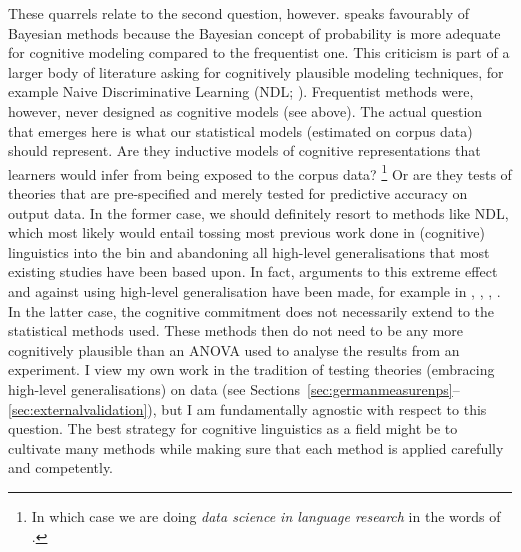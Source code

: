 \documentclass[USenglish]{article}
\begin{document}
These quarrels relate to the second question, however.
\citet[301--302]{Divjak2016a} speaks favourably of Bayesian methods because the Bayesian concept of probability is more adequate for cognitive modeling compared to the frequentist one.
This criticism is part of a larger body of literature asking for cognitively plausible modeling techniques, for example Naive Discriminative Learning (NDL; \citealp{Baayen2011,BaayenEa2013,MilinEa2016,TheijssenEa2013}).
Frequentist methods were, however, never designed as cognitive models (see above).
The actual question that emerges here is what our statistical models (estimated on corpus data) should represent.
Are they inductive models of cognitive representations that learners would infer from being exposed to the corpus data?%
\footnote{In which case we are doing \textit{data science in language research} in the words of \citealp{MilinEa2016}.}
Or are they tests of theories that are pre-specified and merely tested for predictive accuracy on output data.
In the former case, we should definitely resort to methods like NDL, which most likely would entail tossing most previous work done in (cognitive) linguistics into the bin and abandoning all high-level generalisations that most existing studies have been based upon.
In fact, arguments to this extreme effect and against using high-level generalisation have been made, for example in \cite{BaayenEa2016}, \citet[299--300]{Divjak2016a}, \cite{RamscarPort2016}, \cite{TheijssenEa2013}.
In the latter case, the cognitive commitment does not necessarily extend to the statistical methods used.
These methods then do not need to be any more cognitively plausible than an ANOVA used to analyse the results from an experiment.
I view my own work in the tradition of testing theories (embracing high-level generalisations) on data (see Sections~\ref{sec:germanmeasurenps}--\ref{sec:externalvalidation}), but I am fundamentally agnostic with respect to this question.
The best strategy for cognitive linguistics as a field might be to cultivate many methods while making sure that each method is applied carefully and competently.
\end{document}
